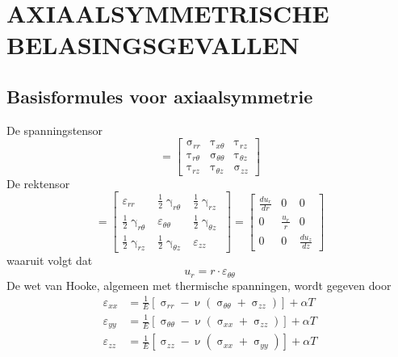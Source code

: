     \section{AXIAALSYMMETRISCHE BELASINGSGEVALLEN}

        \subsection{Basisformules voor axiaalsymmetrie}

            De spanningstensor
            \begin{equation}
                [\upsigma] = \left[\begin{matrix}
                    \upsigma_{rr} & \uptau_{x\theta} & \uptau_{rz} \\
                    \uptau_{r\theta} & \upsigma_{\theta \theta} & \uptau_{\theta z} \\
                    \uptau_{rz} & \uptau_{\theta z} & \upsigma_{zz}
                \end{matrix}\right]
            \end{equation}
            De rektensor      
            \begin{equation}
                [\varepsilon] = \left[\begin{matrix}
                    \varepsilon_{rr} & \frac{1}{2}\upgamma_{r\theta} & \frac{1}{2}\upgamma_{rz} \\
                    \frac{1}{2}\upgamma_{r\theta} & \varepsilon_{\theta\theta} & \frac{1}{2}\upgamma_{\theta z} \\
                    \frac{1}{2}\upgamma_{rz} & \frac{1}{2}\upgamma_{\theta z} & \varepsilon_{zz}
                \end{matrix}\right] = \left[\begin{matrix}
                    \frac{du_r}{dr} & 0 & 0\\
                    0 & \frac{u_r}{r} & 0\\
                    0 & 0 & \frac{du_z}{dz}
                \end{matrix}\right]
            \end{equation}
            waaruit volgt dat 
            \begin{equation}
                u_r = r\cdot\varepsilon_{\theta\theta}
            \end{equation}
            De wet van Hooke, algemeen met thermische spanningen, wordt gegeven door
            \begin{align}
                \varepsilon_{xx} &= \frac{1}{E}\left[\upsigma_{rr} - \upnu\left(\upsigma_{\theta\theta}+\upsigma_{zz}\right)\right] + \alpha T\nonumber\\
                \varepsilon_{yy} &= \frac{1}{E}\left[\upsigma_{\theta\theta} - \upnu\left(\upsigma_{xx}+\upsigma_{zz}\right)\right] + \alpha T\\
                \varepsilon_{zz} &= \frac{1}{E}\left[\upsigma_{zz} - \upnu\left(\upsigma_{xx}+\upsigma_{yy}\right)\right] + \alpha T\nonumber\\
            \end{align}
        
